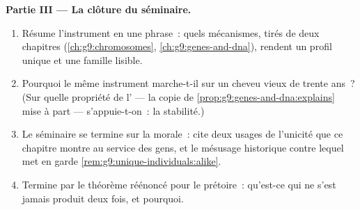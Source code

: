 \begin{problem}
\medskip\noindent\textbf{Partie III --- La clôture du
séminaire.}
\begin{enumerate}[resume]
  \item Résume l'instrument en une phrase~: quels
        mécanismes, tirés de deux chapitres
        (\cref{ch:g9:chromosomes},
        \cref{ch:g9:genes-and-dna}), rendent un profil
        unique et une famille lisible.
  \item Pourquoi le même instrument marche-t-il sur un
        cheveu vieux de trente ans~? (Sur quelle propriété
        de l' --- la copie de
        \cref{prop:g9:genes-and-dna:explains} mise à part
        --- s'appuie-t-on~: la stabilité.)
  \item Le séminaire se termine sur la morale~: cite deux
        usages de l'unicité que ce chapitre montre au
        service des gens, et le mésusage historique contre
        lequel met en garde
        \cref{rem:g9:unique-individuals:alike}.
  \item Termine par le théorème réénoncé pour le prétoire~:
        qu'est-ce qui ne s'est jamais produit deux fois, et
        pourquoi.
\end{enumerate}
\end{problem}
